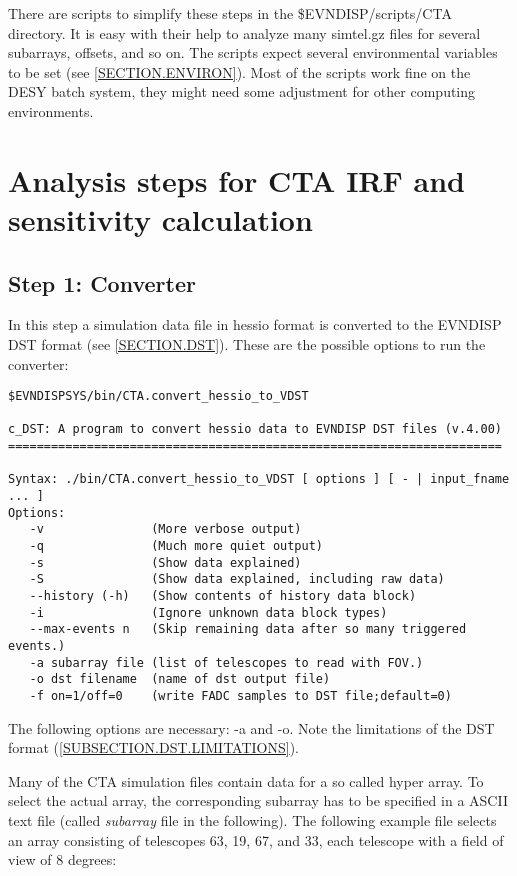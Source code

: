 \documentclass[titlepage,a4paper,twoside,11pt]{report}
\begin{document}
There are scripts to simplify these steps in the \$EVNDISP/scripts/CTA directory. 
It is easy with their help to analyze many simtel.gz files for several subarrays, offsets, and so on. 
The scripts expect several environmental variables to be set (see \ref{SECTION.ENVIRON}).
Most of the scripts work fine on the DESY batch system, they might need some adjustment for other computing environments.

\section{Analysis steps for CTA IRF and sensitivity calculation}

\subsection{Step 1: Converter}

In this step a simulation data file in hessio format is converted to the EVNDISP DST format 
(see \ref{SECTION.DST}). These are the possible options to run the converter:

\begin{lstlisting}
$EVNDISPSYS/bin/CTA.convert_hessio_to_VDST

c_DST: A program to convert hessio data to EVNDISP DST files (v.4.00)
=====================================================================

Syntax: ./bin/CTA.convert_hessio_to_VDST [ options ] [ - | input_fname ... ]
Options:
   -v               (More verbose output)
   -q               (Much more quiet output)
   -s               (Show data explained)
   -S               (Show data explained, including raw data)
   --history (-h)   (Show contents of history data block)
   -i               (Ignore unknown data block types)
   --max-events n   (Skip remaining data after so many triggered events.)
   -a subarray file (list of telescopes to read with FOV.)
   -o dst filename  (name of dst output file)
   -f on=1/off=0    (write FADC samples to DST file;default=0)
\end{lstlisting}

The following options are necessary: -a and -o.
Note the limitations of the DST format (\ref{SUBSECTION.DST.LIMITATIONS}).

Many of the CTA simulation files contain data for a so called hyper array. 
To select the actual array, the corresponding subarray has to be specified in a ASCII text file (called {\it subarray} file in the following).
The following example file selects an array consisting of telescopes 63, 19, 67, and 33, each telescope
with a field of view of 8 degrees:
\end{document}
